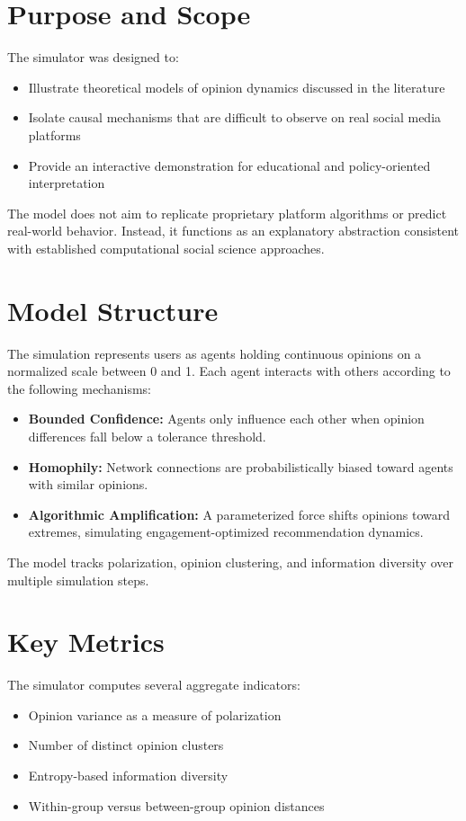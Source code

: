 \documentclass[12pt,a4paper]{report}
\begin{document}
\section{Purpose and Scope}

The simulator was designed to:
\begin{itemize}
    \item Illustrate theoretical models of opinion dynamics discussed in the literature
    \item Isolate causal mechanisms that are difficult to observe on real social media platforms
    \item Provide an interactive demonstration for educational and policy-oriented interpretation
\end{itemize}

The model does not aim to replicate proprietary platform algorithms or predict real-world behavior. Instead, it functions as an explanatory abstraction consistent with established computational social science approaches.

\section{Model Structure}

The simulation represents users as agents holding continuous opinions on a normalized scale between 0 and 1. Each agent interacts with others according to the following mechanisms:

\begin{itemize}
    \item \textbf{Bounded Confidence:} Agents only influence each other when opinion differences fall below a tolerance threshold.
    \item \textbf{Homophily:} Network connections are probabilistically biased toward agents with similar opinions.
    \item \textbf{Algorithmic Amplification:} A parameterized force shifts opinions toward extremes, simulating engagement-optimized recommendation dynamics.
\end{itemize}

The model tracks polarization, opinion clustering, and information diversity over multiple simulation steps.

\section{Key Metrics}

The simulator computes several aggregate indicators:
\begin{itemize}
    \item Opinion variance as a measure of polarization
    \item Number of distinct opinion clusters
    \item Entropy-based information diversity
    \item Within-group versus between-group opinion distances
\end{itemize}
\end{document}

